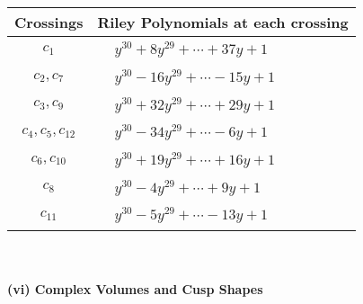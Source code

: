 \documentclass[1p]{elsarticle_modified}
\theoremstyle{definition}
\begin{document}
\begin{tabular}{m{50pt}|m{274pt}}
Crossings & \hspace{64pt}Riley Polynomials at each crossing \\
\hline $$\begin{aligned}c_{1}\end{aligned}$$&$\begin{aligned}
&y^{30}+8 y^{29}+\cdots+37 y+1
\end{aligned}$\\
\hline $$\begin{aligned}c_{2},c_{7}\end{aligned}$$&$\begin{aligned}
&y^{30}-16 y^{29}+\cdots-15 y+1
\end{aligned}$\\
\hline $$\begin{aligned}c_{3},c_{9}\end{aligned}$$&$\begin{aligned}
&y^{30}+32 y^{29}+\cdots+29 y+1
\end{aligned}$\\
\hline $$\begin{aligned}c_{4},c_{5},c_{12}\end{aligned}$$&$\begin{aligned}
&y^{30}-34 y^{29}+\cdots-6 y+1
\end{aligned}$\\
\hline $$\begin{aligned}c_{6},c_{10}\end{aligned}$$&$\begin{aligned}
&y^{30}+19 y^{29}+\cdots+16 y+1
\end{aligned}$\\
\hline $$\begin{aligned}c_{8}\end{aligned}$$&$\begin{aligned}
&y^{30}-4 y^{29}+\cdots+9 y+1
\end{aligned}$\\
\hline $$\begin{aligned}c_{11}\end{aligned}$$&$\begin{aligned}
&y^{30}-5 y^{29}+\cdots-13 y+1
\end{aligned}$\\
\hline
\end{tabular}\\~\\
\newpage\flushleft \textbf{(vi) Complex Volumes and Cusp Shapes}
\end{document}
